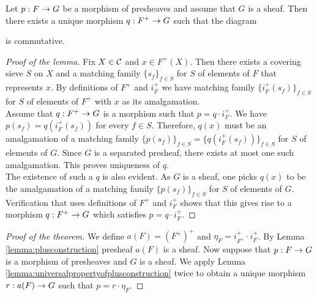 \begin{lemma}\label{lemma:universalpropertyofplusconstruction}
Let $p:F\rightarrow G$ be a morphism of presheaves and assume that $G$ is a sheaf. Then there exists a unique morphism $q:F^+\rightarrow G$ such that the diagram
\begin{center}
\end{center}
is commutative.
\end{lemma}
\begin{proof}[Proof of the lemma]
Fix $X\in {\mathcal C}$ and $x\in F^+(X)$. Then there exists a covering sieve $S$ on $X$ and a matching family $\{s_f\}_{f\in S}$ for $S$ of elements of $F$ that represents $x$. By definitions of $F^+$ and $i_F^+$ we have matching family $\{i_F^+(s_f)\}_{f\in S}$ for $S$ of elements of $F^+$ with $x$ as its amalgamation.\\
Assume that $q:F^+\rightarrow G$ is a morphism such that $p=q\cdot i^+_F$.  We have $p(s_f)=q(i_F^+(s_f))$ for every $f\in S$. Therefore, $q(x)$ must be an amalgamation of a matching family $\{p(s_f)\}_{f\in S}=\{q(i^+_F(s_f))\}_{f\in S}$ for $S$ of elements of $G$. Since $G$ is a separated presheaf, there exists at most one such amalgamation. This proves uniqueness of $q$.\\
The existence of such a $q$ is also evident. As $G$ is a sheaf, one picks $q(x)$ to be the amalgamation of a matching family $\{p(s_f)\}_{f\in S}$ for $S$ of elements of $G$. Verification that uses definitions of $F^+$ and $i^+_F$ shows that this gives rise to a morphism $q:F^+\rightarrow G$ which satisfies $p=q\cdot i^+_F$.
\end{proof}

\begin{proof}[Proof of the theorem]
We define $a(F)=\left(F^+\right)^+$ and $\eta_F=i^+_{F^+}\cdot i^+_F$. By Lemma \ref{lemma:plusconstruction} presheaf $a(F)$ is a sheaf. Now suppose that $p:F\rightarrow G$ is a morphism of presheaves and $G$ is a sheaf. We apply Lemma \ref{lemma:universalpropertyofplusconstruction} twice to obtain a unique morphism $r:a(F)\rightarrow G$ such that $p=r\cdot \eta_F$.
\end{proof}







\small




